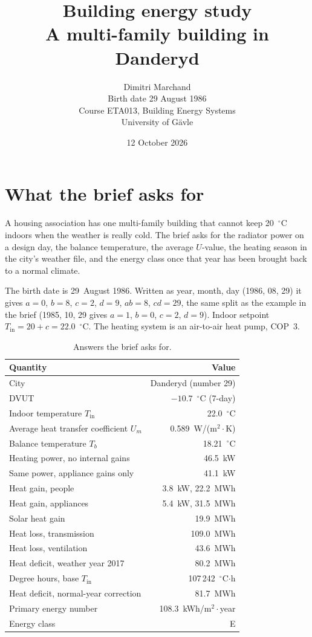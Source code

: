 \documentclass[11pt,a4paper]{article}
\title{%
  Building energy study\\[0.35em]
  \large A multi-family building in Danderyd%
}
\author{%
  Dimitri Marchand\\
  \small Birth date 29 August 1986\\[0.35em]
  \small Course ETA013, Building Energy Systems\\
  \small University of G\"avle%
}
\date{12 October 2026}
\newcommand{\degC}{\ensuremath{^{\circ}\mathrm{C}}}
\newcommand{\WmTwoK}{W/(m$^{2}{\cdot}$K)}
\begin{document}
\maketitle
\thispagestyle{fancy}

\section{What the brief asks for}

A housing association has one multi-family building that cannot keep
20~\degC{} indoors when the weather is really cold. The brief asks for
the radiator power on a design day, the balance temperature, the average
$U$-value, the heating season in the city's weather file, and the energy
class once that year has been brought back to a normal climate.

The birth date is 29~August 1986. Written as year, month, day
(1986, 08, 29) it gives $a = 0$, $b = 8$, $c = 2$, $d = 9$, $ab = 8$,
$cd = 29$, the same split as the example in the brief
(1985, 10, 29 gives $a = 1$, $b = 0$, $c = 2$, $d = 9$).
Indoor setpoint $T_{\mathrm{in}} = 20 + c = 22.0$~\degC.
The heating system is an air-to-air heat pump, COP~3.

\begin{table}[ht]
\centering
\caption{Answers the brief asks for.}
\label{tab:answers}
\begin{tabularx}{\textwidth}{@{}>{\raggedright\arraybackslash}X r@{}}
\toprule
Quantity & Value \\
\midrule
City & Danderyd (number 29) \\
DVUT & $-10.7$~\degC{} (7-day) \\
Indoor temperature $T_{\mathrm{in}}$ & 22.0~\degC \\
Average heat transfer coefficient $U_m$ & 0.589~\WmTwoK \\
Balance temperature $T_b$ & 18.21~\degC \\
Heating power, no internal gains & 46.5~kW \\
Same power, appliance gains only & 41.1~kW \\
Heat gain, people & 3.8~kW, 22.2~MWh \\
Heat gain, appliances & 5.4~kW, 31.5~MWh \\
Solar heat gain & 19.9~MWh \\
Heat loss, transmission & 109.0~MWh \\
Heat loss, ventilation & 43.6~MWh \\
Heat deficit, weather year 2017 & 80.2~MWh \\
Degree hours, base $T_{\mathrm{in}}$ & 107\,242~\degC$\cdot$h \\
Heat deficit, normal-year correction & 81.7~MWh \\
Primary energy number & 108.3~kWh/m$^{2}{\cdot}$year \\
Energy class & E \\
\bottomrule
\end{tabularx}
\end{table}
\end{document}

